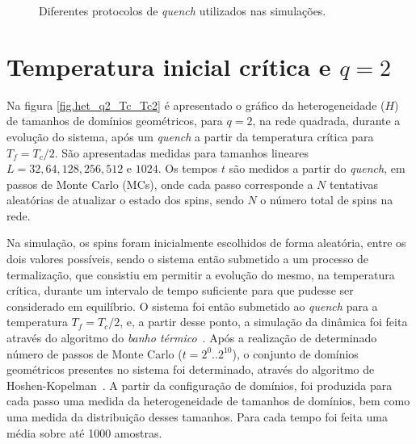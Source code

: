 \begin{figure}[h!]
 \setlength\fboxsep{10pt}
 \setlength\fboxrule{0.5pt}
 \centering
 \caption{Diferentes protocolos de \textit{quench} utilizados nas simulações.}
\label{fig.temperaturas}
\end{figure}


\section{Temperatura inicial crítica e $q=2$}
\label{sec.TcQ2}

Na figura \ref{fig.het_q2_Tc_Tc2} é apresentado o gráfico da heterogeneidade ($H$) de tamanhos de domínios geométricos, para $q=2$, na rede quadrada, durante a evolução do sistema, após um \textit{quench} a partir da temperatura crítica para $T_f=T_c/2$. São apresentadas medidas para tamanhos lineares $L=32, 64, 128, 256, 512$ e $1024$. Os tempos $t$ são medidos a partir do \textit{quench}, em passos de Monte Carlo (MCs), onde cada passo corresponde a $N$ tentativas aleatórias de atualizar o estado dos spins, sendo $N$ o número total de spins na rede.

Na simulação, os spins foram inicialmente escolhidos de forma aleatória, entre os dois valores possíveis, sendo o sistema então submetido a um processo de termalização, que consistiu em permitir a evolução do mesmo, na temperatura crítica, durante um intervalo de tempo suficiente para que pudesse ser considerado em equilíbrio. O sistema foi então submetido ao \textit{quench} para a temperatura $T_f=T_c/2$, e, a partir desse ponto, a simulação da dinâmica foi feita através do algoritmo do \textit{banho térmico}~\cite{Newman}. Após a realização de determinado número de passos de Monte Carlo ($t=2^0..2^{10}$), o conjunto de domínios geométricos presentes no sistema foi determinado, através do algoritmo de Hoshen-Kopelman~\cite{HoshenKopelman}. A partir da configuração de domínios, foi produzida para cada passo uma medida da heterogeneidade de tamanhos de domínios, bem como uma medida da distribuição desses tamanhos. Para cada tempo foi feita uma média sobre até 1000 amostras.

